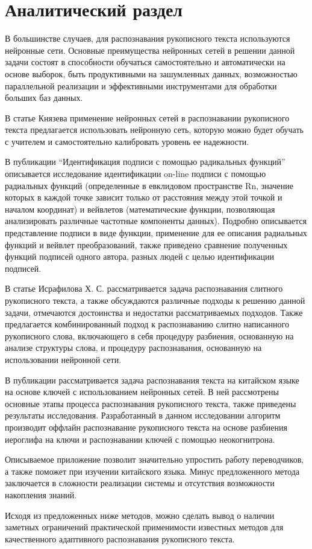 
\chapter{Аналитический раздел}

В большинстве случаев, для распознавания рукописного текста используются нейронные сети. Основные преимущества нейронных сетей в решении данной задачи состоят в способности обучаться самостоятельно и автоматически на основе выборок, быть продуктивными на зашумленных данных, возможностью параллельной реализации и эффективными инструментами для обработки больших баз данных.

В статье Князева \cite{fl1} применение нейронных сетей в распознавании рукописного текста предлагается использовать нейронную сеть, которую можно будет обучать с учителем и самостоятельно калибровать уровень ее надежности.

В публикации “Идентификация подписи с помощью радикальных функций” \cite{fl2} описывается исследование идентификации on-line подписи с помощью радиальных функций (определенные в евклидовом пространстве Rn, значение которых в каждой точке зависит только от расстояния между этой точкой и началом координат) и вейвлетов (математические функции, позволяющая анализировать различные частотные компоненты данных). Подробно описывается представление подписи в виде функции, применение для ее описания радиальных функций и вейвлет преобразований, также приведено сравнение полученных функций подписей одного автора, разных людей с целью идентификации подписей.

В статье Исрафилова Х. С. \cite{fl3} рассматривается задача распознавания слитного рукописного текста, а также обсуждаются различные подходы к решению данной задачи, отмечаются достоинства и недостатки рассматриваемых подходов. Также предлагается комбинированный подход к распознаванию слитно написанного рукописного слова, включающего в себя процедуру разбиения, основанную на анализе структуры слова, и процедуру распознавания, основанную на использовании нейронной сети.

В публикации \cite{fl4} рассматривается задача распознавания текста на китайском языке на основе ключей с использованием нейронных сетей. В ней рассмотрены основные этапы процесса распознавания рукописного текста, также приведены результаты исследования. Разработанный в данном исследовании алгоритм производит оффлайн распознавание рукописного текста на основе разбиения иероглифа на ключи и распознавании ключей с помощью неокогнитрона.

Описываемое приложение позволит значительно упростить работу переводчиков, а также поможет при изучении китайского языка. Минус предложенного метода заключается в сложности реализации системы и отсутствия возможности накопления знаний.

Исходя из предложенных ниже методов, можно сделать вывод о наличии заметных ограничений практической применимости известных методов для качественного адаптивного распознавания рукописного текста.
